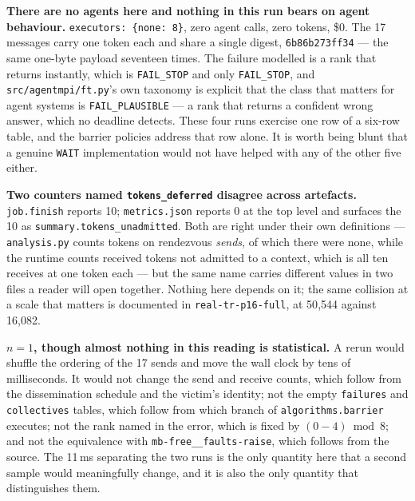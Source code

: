 \documentclass[11pt]{article}
\begin{document}
\textbf{There are no agents here and nothing in this run bears on agent behaviour.}
\texttt{executors: \{none: 8\}}, zero agent calls, zero tokens, \$0. The 17 messages carry
one token each and share a single digest, \texttt{6b86b273ff34} --- the same one-byte
payload seventeen times. The failure modelled is a rank that returns instantly, which is
\texttt{FAIL\_STOP} and only \texttt{FAIL\_STOP}, and \texttt{src/agentmpi/ft.py}'s own
taxonomy is explicit that the class that matters for agent systems is
\texttt{FAIL\_PLAUSIBLE} --- a rank that returns a confident wrong answer, which no
deadline detects. These four runs exercise one row of a six-row table, and the barrier
policies address that row alone. It is worth being blunt that a genuine \texttt{WAIT}
implementation would not have helped with any of the other five either.

\textbf{Two counters named \texttt{tokens\_deferred} disagree across artefacts.}
\texttt{job.finish} reports 10; \texttt{metrics.json} reports 0 at the top level and
surfaces the 10 as \texttt{summary.tokens\_unadmitted}. Both are right under their own
definitions --- \texttt{analysis.py} counts tokens on rendezvous \emph{sends}, of which
there were none, while the runtime counts received tokens not admitted to a context, which
is all ten receives at one token each --- but the same name carries different values in
two files a reader will open together. Nothing here depends on it; the same collision at a
scale that matters is documented in \texttt{real-tr-p16-full}, at 50{,}544 against
16{,}082.

\textbf{$n=1$, though almost nothing in this reading is statistical.} A rerun would shuffle
the ordering of the 17 sends and move the wall clock by tens of milliseconds. It would not
change the send and receive counts, which follow from the dissemination schedule and the
victim's identity; not the empty \texttt{failures} and \texttt{collectives} tables, which
follow from which branch of \texttt{algorithms.barrier} executes; not the rank named in the
error, which is fixed by $(0-4) \bmod 8$; and not the equivalence with
\texttt{mb-free\_\_faults-raise}, which follows from the source. The 11\,ms separating the
two runs is the only quantity here that a second sample would meaningfully change, and it
is also the only quantity that distinguishes them.
\end{document}
